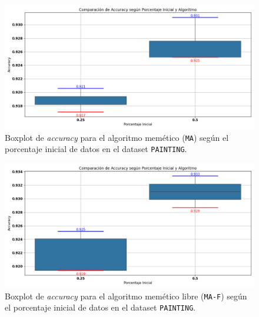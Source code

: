\begin{figure}[htp]
    \centering
    \includegraphics[width=1\textwidth]{imagenes/evaluaciones/painting/comparacion-por-porcentaje-mem.png}
    \caption{Boxplot de \textit{accuracy} para el algoritmo memético (\texttt{MA}) según el porcentaje inicial de datos en el dataset \texttt{PAINTING}.}
    \label{fig:comparacion-por-porcentaje-mem}
\end{figure}

\begin{figure}[htp]
    \centering
    \includegraphics[width=1\textwidth]{imagenes/evaluaciones/painting/comparacion-por-porcentaje-mem-f.png}
    \caption{Boxplot de \textit{accuracy} para el algoritmo memético libre (\texttt{MA-F}) según el porcentaje inicial de datos en el dataset \texttt{PAINTING}.}
    \label{fig:comparacion-por-porcentaje-mem-f}
\end{figure}

